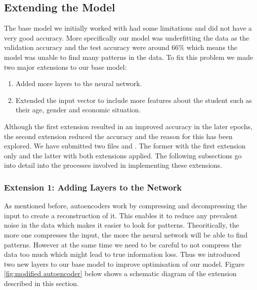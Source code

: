 \documentclass{article}
\begin{document}
\subsection*{Extending the Model}
The base model we initially worked with had some limitations and did not have a very good accuracy. More specifically our model was underfitting the data as the validation accuracy and the test accuracy were around $66\%$ which means the model was unable to find many patterns in the data. To fix this problem we made two major extensions to our base model:

\begin{enumerate}
    \item Added more layers to the neural network.
    \item Extended the input vector to include more features about the student such as their age, gender and economic situation.
\end{enumerate}

Although the first extension resulted in an improved accuracy in the later epochs, the second extension reduced the accuracy and the reason for this has been explored. We have submitted two files  and . The former with the first extension only and the latter with both extensions applied. The following subsections go into detail into the processes involved in implementing these extensions.

\subsubsection*{Extension 1: Adding Layers to the Network}
As mentioned before, autoencoders work by compressing and decompressing the input to create a reconstruction of it. This enables it to reduce any prevalent noise in the data which makes it easier to look for patterns. Theoritically, the more one compresses the input, the more the neural network will be able to find patterns. However at the same time we need to be careful to not compress the data too much which might lead to true information loss. Thus we introduced two new layers to our base model to improve optimisation of our model. Figure \ref{fig:modified autoencoder} below shows a schematic diagram of the extension described in this section.
\end{document}
